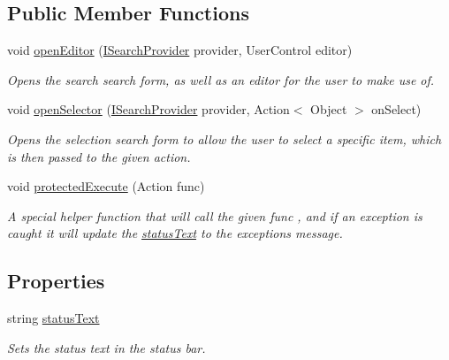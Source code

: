 \subsection*{Public Member Functions}
\begin{DoxyCompactItemize}
\item 
void \mbox{\hyperlink{class_aim_1_1_database_interface_1_1_windows_1_1_main_interface_a2cfee9030c39c4d8a79c0c218d1e6a60}{open\+Editor}} (\mbox{\hyperlink{interface_aim_1_1_database_interface_1_1_interfaces_1_1_i_search_provider}{I\+Search\+Provider}} provider, User\+Control editor)
\begin{DoxyCompactList}\small\item\em Opens the \textquotesingle{}search\textquotesingle{} search form, as well as an editor for the user to make use of. \end{DoxyCompactList}\item 
void \mbox{\hyperlink{class_aim_1_1_database_interface_1_1_windows_1_1_main_interface_a847da5c5a3132847df23e9bbd3118ac1}{open\+Selector}} (\mbox{\hyperlink{interface_aim_1_1_database_interface_1_1_interfaces_1_1_i_search_provider}{I\+Search\+Provider}} provider, Action$<$ Object $>$ on\+Select)
\begin{DoxyCompactList}\small\item\em Opens the \textquotesingle{}selection\textquotesingle{} search form to allow the user to select a specific item, which is then passed to the given action. \end{DoxyCompactList}\item 
void \mbox{\hyperlink{class_aim_1_1_database_interface_1_1_windows_1_1_main_interface_af58ec09a0ee270884c6428192ea96347}{protected\+Execute}} (Action func)
\begin{DoxyCompactList}\small\item\em A special helper function that will call the given {\itshape func} , and if an exception is caught it will update the \mbox{\hyperlink{class_aim_1_1_database_interface_1_1_windows_1_1_main_interface_ab2ea5e6fe7f1a5f7691ae78883bc384e}{status\+Text}} to the exception\textquotesingle{}s message. \end{DoxyCompactList}\end{DoxyCompactItemize}
\subsection*{Properties}
\begin{DoxyCompactItemize}
\item 
string \mbox{\hyperlink{class_aim_1_1_database_interface_1_1_windows_1_1_main_interface_ab2ea5e6fe7f1a5f7691ae78883bc384e}{status\+Text}}
\begin{DoxyCompactList}\small\item\em Sets the status text in the status bar. \end{DoxyCompactList}\end{DoxyCompactItemize}


